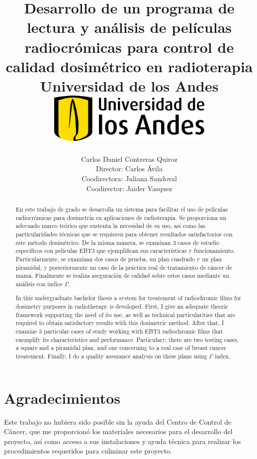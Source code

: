 \documentclass[12pt]{report}
\title 
{
	{Desarrollo de un programa de lectura y análisis de películas radiocrómicas para control de calidad dosimétrico en radioterapia}\\
	{\large Universidad de los Andes}\\
	\vspace{1.5cm}
	{\includegraphics[width = 0.6\textwidth]{logo.png}}	
}
\author{Carlos Daniel Contreras Quiroz\\[1cm]{\small Director: Carlos \'Avila}\\[1cm]{\small Coodirectora: Juliana Sandoval}\\[1cm]{\small Coodirector: Jaider Vasquez}}
\newenvironment{dedication}
  {\clearpage           %
   \thispagestyle{empty}%
   \vspace*{\stretch{1}}%
   \raggedleft          %
  }
  {\par %
   \vspace{\stretch{3}} %
   \clearpage           %
  }
\theoremstyle{definition}
\begin{document}

\maketitle


\begin{abstract}

En este trabajo de grado se desarrolla un sistema para facilitar el uso de películas radiocrómicas para dosimetría en aplicaciones de radioterapia. Se proporciona un adecuado marco teórico que sustenta la necesidad de su uso, así como las particularidades técnicas que se requieren para obtener resultados satisfactorios con este método dosimétrico. De la misma manera, se examinan 3 casos de estudio específicos con películas EBT3 que ejemplifican sus características y funcionamiento. Particularmente, se examinan dos casos de prueba, un plan cuadrado y un plan piramidal, y posteriormente un caso de la práctica real de tratamiento de cáncer de mama. Finalmente se realiza aseguración de calidad sobre estos casos mediante un análisis con indice $\Gamma$.   

\end{abstract}

\begin{otherlanguage}{english}
	
\begin{abstract}
In this undergraduate bachelor thesis a system for treatement of radiochromic films for dosimetry purposes in radiotherapy is devoloped. First, I give an adequate theoric framework supporting the need of its use, as well as technical particularities that are required to obtain satisfactory results with this dosimetric method. After that, I examine 3 particular cases of study working with EBT3 radiochromic films that exemplify its characteristics and performance. Particulary, there are two testing cases, a square and a piramidal plan, and one concerning to a real case of  breast cancer treatement. Finally, I do a quality assurance analysis on these plans using $\Gamma$ index. 

\end{abstract}
\end{otherlanguage}

\newpage

\chapter*{Agradecimientos}
Este trabajo no hubiera sido posible sin la ayuda del Centro de Control de Cáncer, que me proporcionó los materiales necesarios para el desarrollo del proyecto, así como acceso a sus instalaciones y ayuda técnica para realizar los procedimientos requeridos para culminar este proyecto.\\
\end{document}
